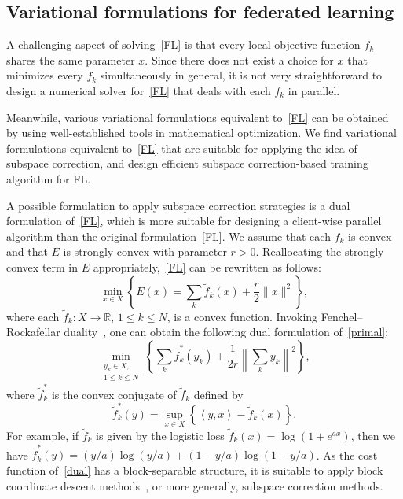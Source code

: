 \begin{itemize}
\subsection{Variational formulations for federated learning}
A challenging aspect of solving~\cref{FL} is that every local objective function $f_k$ shares the same parameter $x$. Since there does not exist a choice for $x$ that minimizes every $f_k$ simultaneously in general, it is not very straightforward to design a numerical solver for~\cref{FL} that deals with each $f_k$ in parallel.

Meanwhile, various variational formulations equivalent to~\cref{FL} can be obtained by using well-established tools in mathematical optimization. We find variational formulations equivalent to~\cref{FL} that are suitable for applying the idea of subspace correction, and design efficient subspace correction-based training algorithm for FL.

A possible formulation to apply subspace correction strategies is a dual formulation of~\cref{FL}, which is more suitable for designing a client-wise parallel algorithm than the original formulation~\cref{FL}. We assume that each $f_k$ is convex and that $E$ is strongly convex with parameter $r > 0$. Reallocating the strongly convex term in $E$ appropriately,~\cref{FL} can be rewritten as follows:
\begin{equation}
    \label{primal}
    \min_{x \in X} \left\{ E(x) = \sum_k \tilde{f}_k (x) + \frac{r}{2} \|x\|^2 \right\},
\end{equation}
where each $\tilde{f}_k \colon X \rightarrow \mathbb{R}$, $1 \leq k \leq N$, is a convex function. Invoking Fenchel--Rockafellar duality~\cite{CP:2016}, one can obtain the following dual formulation of~\cref{primal}:
\begin{equation}
    \label{dual}
    \min_{\substack{y_k \in X, \\ 1\leq k\leq N}} \left\{ \sum_k \tilde{f}_k^* (y_k) + \frac{1}{2r} \left\| \sum_k y_k \right\|^2 \right\},
\end{equation}
where $\tilde{f}_k^*$ is the convex conjugate of $\tilde{f}_k$ defined by
\begin{equation*}
    \tilde{f}_k^* (y) = \sup_{x \in X} \left\{ \left< y, x \right> - \tilde{f}_k (x) \right\}.
\end{equation*}
For example, if $\tilde{f}_k$ is given by the logistic loss $\tilde{f}_k (x) = \log ( 1 + e^{ax})$, then we have $\tilde{f}_k^* (y) = (y/a) \log (y/a) + (1 - y/a) \log (1 - y/a)$.
As the cost function of~\cref{dual} has a block-separable structure, it is suitable to apply block coordinate descent methods~\cite{CP:2015}, or more generally, subspace correction methods.


\end{itemize}
